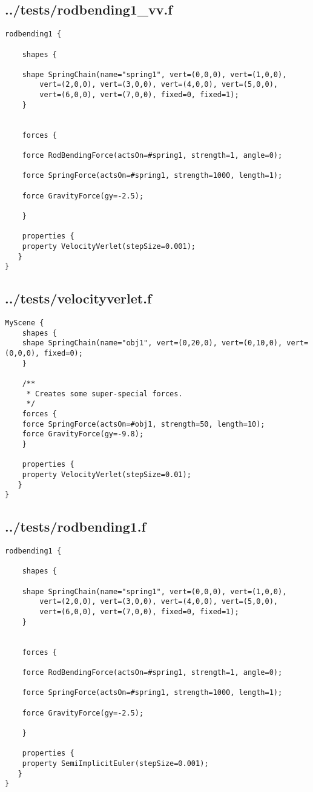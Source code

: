 \subsection*{../tests/rodbending1\_vv.f}
\begin{lstlisting}
rodbending1 {

    shapes {

	shape SpringChain(name="spring1", vert=(0,0,0), vert=(1,0,0),
		vert=(2,0,0), vert=(3,0,0), vert=(4,0,0), vert=(5,0,0),
		vert=(6,0,0), vert=(7,0,0), fixed=0, fixed=1);
    }


    forces {
	
	force RodBendingForce(actsOn=#spring1, strength=1, angle=0);

	force SpringForce(actsOn=#spring1, strength=1000, length=1);

	force GravityForce(gy=-2.5);
	
    }

    properties { 
	property VelocityVerlet(stepSize=0.001);
   }
}

\end{lstlisting}

\subsection*{../tests/velocityverlet.f}
\begin{lstlisting}
MyScene {
    shapes {
	shape SpringChain(name="obj1", vert=(0,20,0), vert=(0,10,0), vert=(0,0,0), fixed=0);
    }

    /**
     * Creates some super-special forces.
     */
    forces {
	force SpringForce(actsOn=#obj1, strength=50, length=10);
	force GravityForce(gy=-9.8);
    }

    properties { 
	property VelocityVerlet(stepSize=0.01);
   }
}
\end{lstlisting}

\subsection*{../tests/rodbending1.f}
\begin{lstlisting}
rodbending1 {

    shapes {

	shape SpringChain(name="spring1", vert=(0,0,0), vert=(1,0,0),
		vert=(2,0,0), vert=(3,0,0), vert=(4,0,0), vert=(5,0,0),
		vert=(6,0,0), vert=(7,0,0), fixed=0, fixed=1);
    }


    forces {
	
	force RodBendingForce(actsOn=#spring1, strength=1, angle=0);

	force SpringForce(actsOn=#spring1, strength=1000, length=1);

	force GravityForce(gy=-2.5);
	
    }

    properties { 
	property SemiImplicitEuler(stepSize=0.001);
   }
}

\end{lstlisting}

